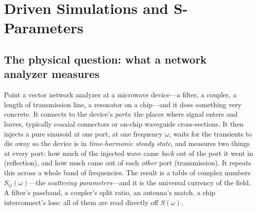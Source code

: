 \chapter{Driven Simulations and S-Parameters}
\label{ch:driven}


\section{The physical question: what a network analyzer measures}

Point a vector network analyzer at a microwave device---a filter, a coupler, a
length of transmission line, a resonator on a chip---and it does something very
concrete. It connects to the device's \emph{ports}: the places where signal
enters and leaves, typically coaxial connectors or on-chip waveguide
cross-sections. It then injects a pure sinusoid at one port, at one frequency
$\omega$, waits for the transients to die away so the device is in
\emph{time-harmonic steady state}, and measures two things at every port: how
much of the injected wave came \emph{back} out of the port it went in
(reflection), and how much came out of each \emph{other} port (transmission). It
repeats this across a whole band of frequencies. The result is a table of complex
numbers $S_{ij}(\omega)$---the \emph{scattering parameters}---and it is the
universal currency of the field. A filter's passband, a coupler's split ratio, an
antenna's match, a chip interconnect's loss: all of them are read directly off
$S(\omega)$.

